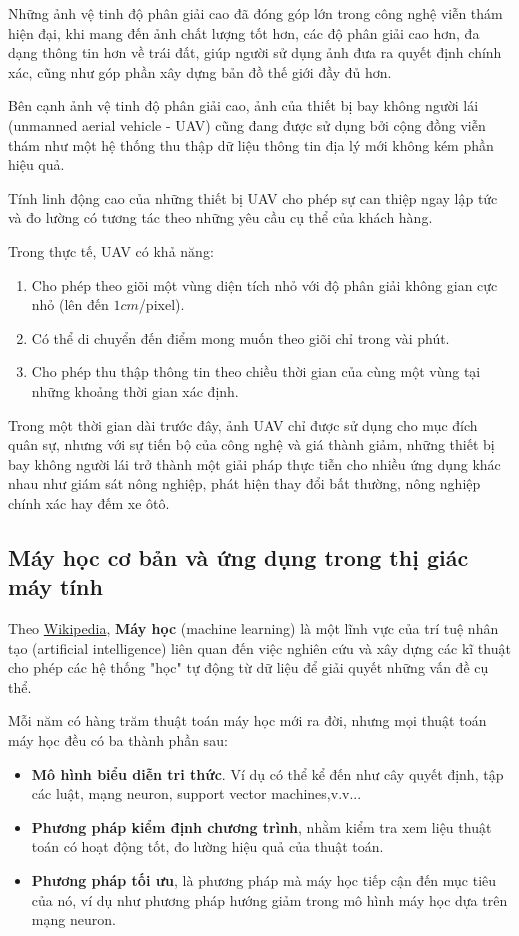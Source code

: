 \documentclass[14pt, oneside, a4paper, openany]{scrartcl}
\begin{document}
Những ảnh vệ tinh độ phân giải cao đã đóng góp lớn trong công nghệ viễn thám hiện đại, khi mang đến ảnh chất lượng tốt hơn, các độ phân giải cao hơn, đa dạng thông tin hơn về trái đất, giúp người sử dụng ảnh đưa ra quyết định chính xác, cũng như góp phần xây dựng bản đồ thế giới đầy đủ hơn.

Bên cạnh ảnh vệ tinh độ phân giải cao, ảnh của thiết bị bay không người lái  (unmanned aerial vehicle - UAV) cũng đang được sử dụng bởi cộng đồng viễn thám như một hệ thống thu thập dữ liệu thông tin địa lý mới không kém phần hiệu quả.

Tính linh động cao của những thiết bị UAV cho phép sự can thiệp ngay lập tức và đo lường có tương tác theo những yêu cầu cụ thể của khách hàng.

Trong thực tế, UAV có khả năng:
\begin{enumerate}
	\item Cho phép theo giõi một vùng diện tích nhỏ với độ phân giải không gian cực nhỏ (lên đến $1cm$/pixel).
	\item Có thể di chuyển đến điểm mong muốn theo giõi chỉ trong vài phút.
	\item Cho phép thu thập thông tin theo chiều thời gian của cùng một vùng tại những khoảng thời gian xác định.
\end{enumerate}

Trong một thời gian dài trước đây, ảnh UAV chỉ được sử dụng cho mục đích quân sự, nhưng với sự tiến bộ của công nghệ và giá thành giảm, những thiết bị bay không người lái trở thành một giải pháp thực tiễn cho nhiều ứng dụng khác nhau như giám sát nông nghiệp, phát hiện thay đổi bất thường, nông nghiệp chính xác hay đếm xe ôtô.

\subsection{Máy học cơ bản và ứng dụng trong thị giác máy tính}
Theo \href{https://vi.wikipedia.org/wiki/H\%E1\%BB\%8Dc_m\%C3\%A1y}{Wikipedia}, \textbf{Máy học}  (machine learning) là một lĩnh vực của trí tuệ nhân tạo (artificial intelligence) liên quan đến việc nghiên cứu và xây dựng các kĩ thuật cho phép các hệ thống "học" tự động từ dữ liệu để giải quyết những vấn đề cụ thể.

Mỗi năm có hàng trăm thuật toán máy học mới ra đời, nhưng mọi thuật toán máy học đều có ba thành phần sau:
\begin{itemize}
	\item \textbf{Mô hình biểu diễn tri thức}. Ví dụ có thể kể đến như cây quyết định, tập các luật, mạng neuron, support vector machines,v.v...
	\item \textbf{Phương pháp kiểm định chương trình}, nhằm kiểm tra xem liệu thuật toán có hoạt động tốt, đo lường hiệu quả của thuật toán. 
	\item \textbf{Phương pháp tối ưu}, là phương pháp mà máy học tiếp cận đến mục tiêu của nó, ví dụ như phương pháp hướng giảm trong mô hình máy học dựa trên mạng neuron.
\end{itemize}
\end{document}
